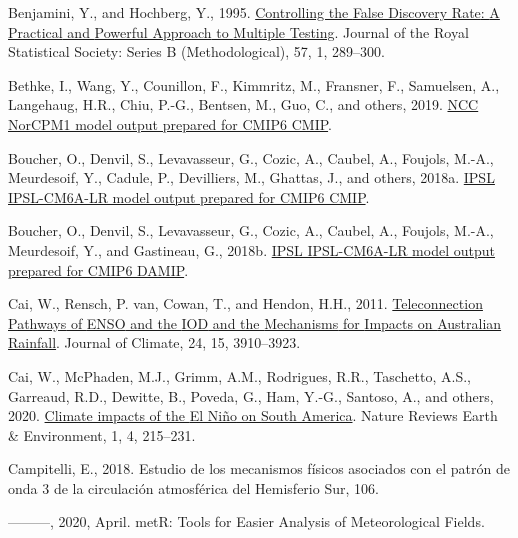 \documentclass[12pt,oneside]{reedthesis}
\newlength{\cslhangindent}
\newenvironment{CSLReferences}[2] %
 {%
  \setlength{\parindent}{0pt}
  \ifodd #1 \everypar{\setlength{\hangindent}{\cslhangindent}}\ignorespaces\fi
  \ifnum #2 > 0
  \setlength{\parskip}{#2\baselineskip}
  \fi
 }%
 {}
\begin{document}
\begin{CSLReferences}{1}{0}
\leavevmode{}%
Benjamini, Y., and Hochberg, Y., 1995. \href{https://doi.org/10.1111/j.2517-6161.1995.tb02031.x}{Controlling the {False Discovery Rate}: {A Practical} and {Powerful Approach} to {Multiple Testing}}. Journal of the Royal Statistical Society: Series B (Methodological), 57, 1, 289--300.

\leavevmode{}%
Bethke, I., Wang, Y., Counillon, F., Kimmritz, M., Fransner, F., Samuelsen, A., Langehaug, H.R., Chiu, P.-G., Bentsen, M., Guo, C., and others, 2019. \href{https://doi.org/10.22033/ESGF/CMIP6.10843}{NCC NorCPM1 model output prepared for CMIP6 CMIP}.

\leavevmode{}%
Boucher, O., Denvil, S., Levavasseur, G., Cozic, A., Caubel, A., Foujols, M.-A., Meurdesoif, Y., Cadule, P., Devilliers, M., Ghattas, J., and others, 2018a. \href{https://doi.org/10.22033/ESGF/CMIP6.1534}{IPSL IPSL-CM6A-LR model output prepared for CMIP6 CMIP}.

\leavevmode{}%
Boucher, O., Denvil, S., Levavasseur, G., Cozic, A., Caubel, A., Foujols, M.-A., Meurdesoif, Y., and Gastineau, G., 2018b. \href{https://doi.org/10.22033/ESGF/CMIP6.13801}{IPSL IPSL-CM6A-LR model output prepared for CMIP6 DAMIP}.

\leavevmode{}%
Cai, W., Rensch, P. van, Cowan, T., and Hendon, H.H., 2011. \href{https://doi.org/10.1175/2011JCLI4129.1}{Teleconnection {Pathways} of {ENSO} and the {IOD} and the {Mechanisms} for {Impacts} on {Australian Rainfall}}. Journal of Climate, 24, 15, 3910--3923.

\leavevmode{}%
Cai, W., McPhaden, M.J., Grimm, A.M., Rodrigues, R.R., Taschetto, A.S., Garreaud, R.D., Dewitte, B., Poveda, G., Ham, Y.-G., Santoso, A., and others, 2020. \href{https://doi.org/10.1038/s43017-020-0040-3}{Climate impacts of the {El Niño} on {South America}}. Nature Reviews Earth \& Environment, 1, 4, 215--231.

\leavevmode{}%
Campitelli, E., 2018. {Estudio de los mecanismos físicos asociados con el patrón de onda 3 de la circulación atmosférica del Hemisferio Sur}, 106.

\leavevmode{}%
---------, 2020, April. {metR}: {Tools} for {Easier Analysis} of {Meteorological Fields}.


\end{CSLReferences}
\end{document}

